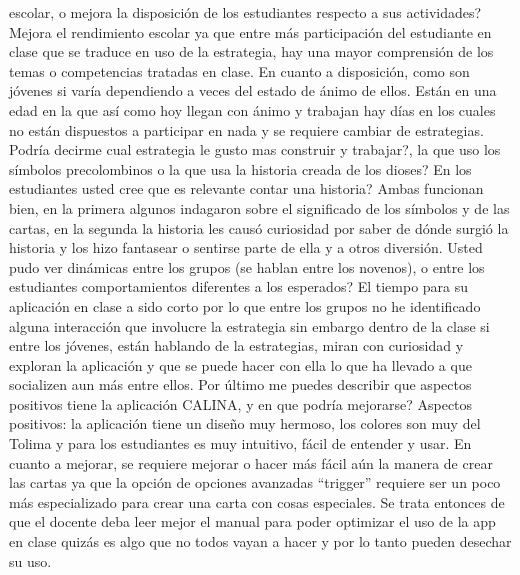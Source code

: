 \begin{dialogue}
	escolar, o mejora la disposición de los estudiantes respecto a sus actividades?
	 Mejora el rendimiento escolar ya que entre más participación del estudiante 
	en clase que se traduce en uso de la estrategia, hay una mayor comprensión de los temas o competencias 
	tratadas en clase.
	 En cuanto a disposición, como son jóvenes si varía dependiendo a veces del 
	estado de ánimo de ellos. Están en una edad en la que así como hoy llegan con ánimo y trabajan hay 
	días en los cuales no están dispuestos a participar en nada y se requiere cambiar de estrategias.
	 Podría decirme cual estrategia le gusto mas construir y trabajar?, la que uso los 
	símbolos precolombinos o la que usa la historia creada de los dioses? En los estudiantes usted cree 
	que es relevante contar una historia?
	 Ambas funcionan bien, en la primera algunos indagaron sobre el significado de 
	los símbolos y de las cartas, en la segunda la historia les causó curiosidad por saber de dónde surgió 
	la historia y los hizo fantasear o sentirse parte de ella  y a otros  diversión.
	 Usted pudo ver dinámicas entre los grupos (se hablan entre los novenos), o entre los 
	estudiantes comportamientos diferentes a los esperados?
	 El tiempo para su aplicación en clase a sido corto por lo que entre los 
	grupos no he identificado alguna interacción que involucre la estrategia sin embargo dentro de la 
	clase si entre los jóvenes, están hablando de la estrategias, miran con curiosidad y exploran la 
	aplicación y que se puede hacer con ella lo que ha llevado a que socializen aun más entre ellos.
	 Por último me puedes describir que aspectos positivos tiene la aplicación CALINA, y en 
	que podría mejorarse?
	 Aspectos positivos: la aplicación tiene un diseño muy hermoso, los colores 
	son muy del Tolima y  para los estudiantes es muy intuitivo, fácil de entender y usar. En cuanto a 
	mejorar, se requiere mejorar o hacer más fácil aún la manera de crear las cartas ya que la opción de 
	opciones avanzadas ``trigger'' requiere ser un poco más especializado para crear una carta con cosas 
	especiales. Se trata entonces de que el docente deba leer mejor el manual para poder optimizar el uso 
	de la app en clase quizás es algo que no todos vayan a hacer y por lo tanto pueden desechar su uso.
\end{dialogue}
